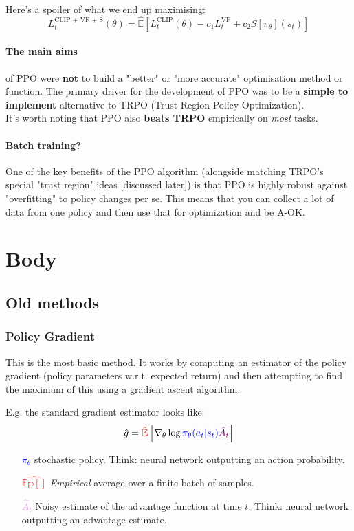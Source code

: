 \documentclass{article}
\begin{document}
Here's a spoiler of what we end up maximising:
\[L_t^{\text{CLIP + VF + S}} (\theta) = \hat{\mathbb{E}} \left [ L_t^{\text{CLIP}}(\theta) - c_1 L_t^{\text{VF}} + c_2 S[\pi_\theta](s_t) \right] \]

\paragraph{The main aims} of PPO were \textbf{not} to build a "better" or "more accurate" optimisation method or function. The primary driver for the development of PPO was to be a \textbf{simple to implement} alternative to TRPO (Trust Region Policy Optimization). \\ 
It's worth noting that PPO also \textbf{beats TRPO} empirically on \emph{most} tasks. 

\paragraph{Batch training?} One of the key benefits of the PPO algorithm (alongside matching TRPO's special "trust region" ideas [discussed later]) is that PPO is highly robust against "overfitting" to policy changes per se.  This means that you can collect a lot of data from one policy and then use that for optimization and be A-OK. 

\section{Body}

\subsection{Old methods}

\subsubsection{Policy Gradient}

This is the most basic method. It works by computing an estimator of the policy gradient (policy parameters w.r.t. expected return) and then attempting to find the maximum of this using a gradient ascent algorithm.

E.g. the standard gradient estimator looks like:
\[ \hat{g} = \textcolor{red}{\hat{\mathbb{E}}} \left [ \nabla_\theta \log \textcolor{blue}{\pi_\theta (a_t | s_t)} \textcolor{violet}{\hat{A}_t} \right ] \]

\begin{itemize}
    \item[\textcolor{blue}{\(\pi_\theta\)}] stochastic policy. Think: neural network outputting an action probability.
    \item[\textcolor{red}{\(\hat{\mathbb{Ep[]}}\)}] \emph{Empirical} average over a finite batch of samples.
    \item[\textcolor{violet}{\(\hat{A}_t\)}] Noisy estimate of the advantage function at time \(t\). Think: neural network outputting an advantage estimate.
\end{itemize}
\end{document}
